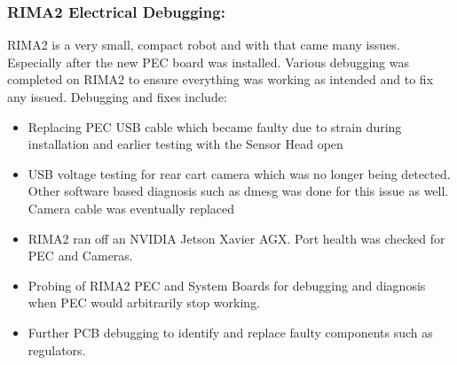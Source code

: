 
\subsubsection{RIMA2 Electrical Debugging:}

RIMA2 is a very small, compact robot and with that came many issues. Especially after the new PEC board was installed. Various debugging was completed on RIMA2 to ensure everything was working as intended and to fix any issued.
Debugging and fixes include:

\begin{itemize}
    \item Replacing PEC USB cable which became faulty due to strain during installation and earlier testing with the Sensor Head open
    \item USB voltage testing for rear cart camera which was no longer being detected. Other software based diagnosis such as dmesg was done for this issue as well. Camera cable was eventually replaced
    \item RIMA2 ran off an NVIDIA Jetson Xavier AGX. Port health was checked for PEC and Cameras.
    \item Probing of RIMA2 PEC and System Boards for debugging and diagnosis when PEC would arbitrarily stop working.
    \item Further PCB debugging to identify and replace faulty components such as regulators.
\end{itemize}